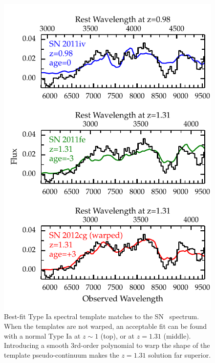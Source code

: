 \begin{figure}
\begin{center}
\includegraphics[width=\columnwidth]{FIG/specfit}
\caption{  \label{fig:SpecFit}
Best-fit Type Ia spectral template matches to the SN \tomas\ spectrum.
When the templates are not warped, an acceptable fit can be found with
a normal Type Ia at $z\sim1$ (top), or at $z=1.31$ (middle).  Introducing a smooth 3rd-order polynomial to warp the shape of the template pseudo-continuum makes the $z=1.31$ solution far superior.}
\end{center}
\end{figure}


